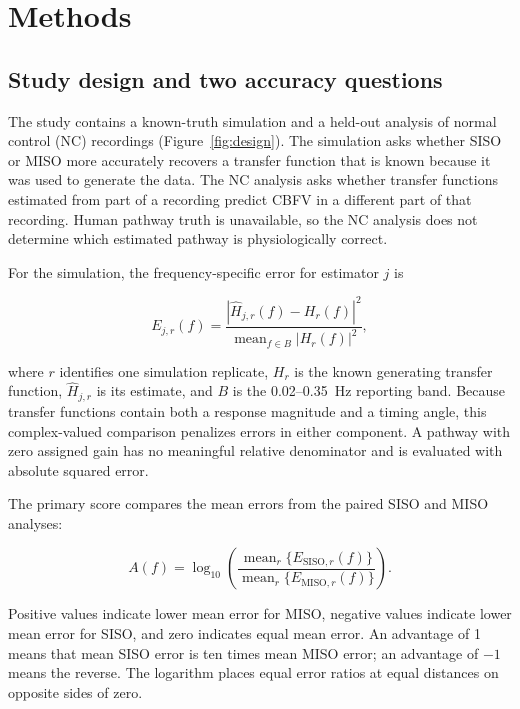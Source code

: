 \documentclass[12pt]{article}
\newcommand{\MISO}{\mathrm{MISO}}
\newcommand{\SISO}{\mathrm{SISO}}
\begin{document}
\section{Methods}

\subsection{Study design and two accuracy questions}

The study contains a known-truth simulation and a held-out analysis of normal
control (NC) recordings (Figure~\ref{fig:design}). The simulation asks whether
SISO or MISO more accurately recovers a transfer function that is known because
it was used to generate the data. The NC analysis asks whether transfer
functions estimated from part of a recording predict CBFV in a different part
of that recording. Human pathway truth is unavailable, so the NC analysis does
not determine which estimated pathway is physiologically correct.

For the simulation, the frequency-specific error for estimator $j$ is

\begin{equation}
E_{j,r}(f) =
\frac{\left|\widehat H_{j,r}(f)-H_r(f)\right|^2}
{\operatorname{mean}_{f\in B}\left|H_r(f)\right|^2},
\label{eq:truth_error}
\end{equation}

where $r$ identifies one simulation replicate, $H_r$ is the known generating
transfer function, $\widehat H_{j,r}$ is its estimate, and $B$ is the
0.02--0.35~Hz reporting band. Because transfer functions contain both a
response magnitude and a timing angle, this complex-valued comparison penalizes
errors in either component. A pathway with zero assigned gain has no meaningful
relative denominator and is evaluated with absolute squared error.

The primary score compares the mean errors from the paired SISO and MISO
analyses:

\begin{equation}
    A(f) = \log_{10}\left(
    \frac{\operatorname{mean}_{r}\{E_{\SISO,r}(f)\}}
    {\operatorname{mean}_{r}\{E_{\MISO,r}(f)\}}
    \right).
    \label{eq:advantage}
\end{equation}

Positive values indicate lower mean error for MISO, negative values indicate
lower mean error for SISO, and zero indicates equal mean error. An advantage of
1 means that mean SISO error is ten times mean MISO error; an advantage of
$-1$ means the reverse. The logarithm places equal error ratios at equal
distances on opposite sides of zero.
\end{document}
